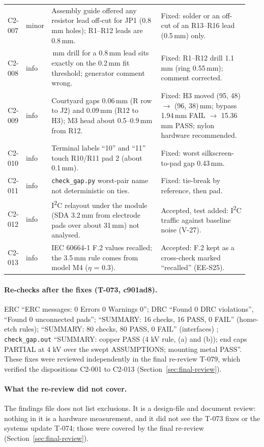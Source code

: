 {\begin{longtable}{@{}>{\raggedright\arraybackslash}p{0.07\linewidth}>{\raggedright\arraybackslash}p{0.06\linewidth}>{\raggedright\arraybackslash}p{0.45\linewidth}>{\raggedright\arraybackslash}p{0.36\linewidth}@{}}
C2-007 & minor & Assembly guide offered any resistor lead off-cut for JP1 (0.8\,mm holes); R1--R12 leads are 0.8\,mm. & Fixed: solder or an off-cut of an R13--R16 lead (0.5\,mm) only. \\
C2-008 & info & 1.0\,mm drill for a 0.8\,mm lead sits exactly on the 0.2\,mm fit threshold; generator comment wrong. & Fixed: R1--R12 drill 1.1\,mm (ring 0.55\,mm); comment corrected. \\
C2-009 & info & Courtyard gaps 0.06\,mm (R row to J2) and 0.09\,mm (R12 to H3); M3 head about 0.5--0.9\,mm from R12. & Fixed: H3 moved (95, 48) $\rightarrow$ (96, 38)\,mm; bypass 1.94\,mm FAIL $\rightarrow$ 15.36\,mm PASS; nylon hardware recommended. \\
C2-010 & info & Terminal labels ``10'' and ``11'' touch R10/R11 pad 2 (about 0.1\,mm). & Fixed: worst silkscreen-to-pad gap 0.43\,mm. \\
C2-011 & info & \nolinkurl{check_gap.py} worst-pair name not deterministic on ties. & Fixed: tie-break by reference, then pad. \\
C2-012 & info & I\textsuperscript{2}C relayout under the module (SDA 3.2\,mm from electrode pads over about 31\,mm) not analysed. & Accepted, test added: I\textsuperscript{2}C traffic against baseline noise (V-27). \\
C2-013 & info & IEC 60664-1 F.2 values recalled; the 3.5\,mm rule comes from model M4 ($\eta$ = 0.3). & Accepted: F.2 kept as a cross-check marked ``recalled'' (EE-S25). \\
\end{longtable}
}

\paragraph{Re-checks after the fixes (T-073, c901ad8).} ERC ``ERC messages: 0
Errors 0 Warnings 0''; DRC ``Found 0 DRC violations'', ``Found 0 unconnected
pads''; ``SUMMARY: 16 checks, 16 PASS, 0 FAIL'' (home-etch rules); ``SUMMARY: 80
checks, 80 PASS, 0 FAIL'' (interfaces) ;
\nolinkurl{check_gap.out} ``SUMMARY: copper PASS (4 kV rule, (a) and (b)); end caps
PARTIAL at 4 kV over the swept ASSUMPTIONS; mounting metal PASS''. These fixes were
reviewed independently in the final re-review T-079, which verified the dispositions
C2-001 to C2-013 (Section~\ref{sec:final-review}).

\paragraph{What the re-review did not cover.} The findings file does not list
exclusions. It is a design-file and document review: nothing in it is a hardware
measurement, and it did not see the T-073 fixes or the systems update T-074; those
were covered by the final re-review (Section~\ref{sec:final-review}).

